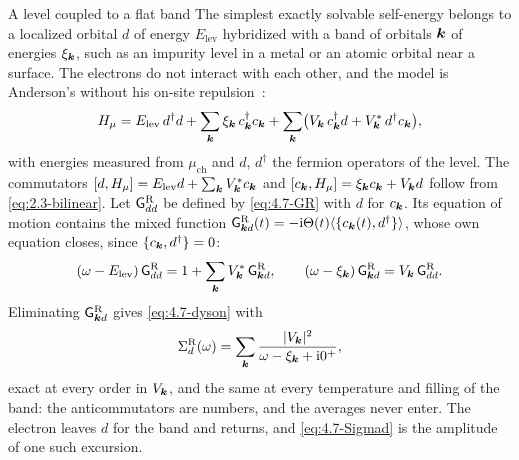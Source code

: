 \begin{workedexample}{A level coupled to a flat band}\label{we:4-level}
The simplest exactly solvable self-energy belongs to a localized orbital $d$ of energy $E_{\mathrm{lev}}$ hybridized with a band of orbitals $\bm{k}$ of energies $\xi_{\bm{k}}$, such as an impurity level in a metal or an atomic orbital near a surface. The electrons do not interact with each other, and the model is Anderson's without his on-site repulsion~\cite{anderson1961localized}:
\begin{equation*}
  H_\mu = E_{\mathrm{lev}}\,d^\dagger d + \sum_{\bm{k}}\xi_{\bm{k}}\,c^\dagger_{\bm{k}}c_{\bm{k}} + \sum_{\bm{k}}\bigl(V_{\bm{k}}\,c^\dagger_{\bm{k}}d + V^*_{\bm{k}}\,d^\dagger c_{\bm{k}}\bigr) ,
\end{equation*}
with energies measured from $\mu_{\mathrm{ch}}$ and $d$, $d^\dagger$ the fermion operators of the level. The commutators $[d, H_\mu] = E_{\mathrm{lev}}d + \sum_{\bm{k}}V^*_{\bm{k}}c_{\bm{k}}$ and $[c_{\bm{k}}, H_\mu] = \xi_{\bm{k}}c_{\bm{k}} + V_{\bm{k}}d$ follow from \cref{eq:2.3-bilinear}. Let $\mathsf{G}^{\mathrm{R}}_{dd}$ be defined by \cref{eq:4.7-GR} with $d$ for $c_{\bm{k}}$. Its equation of motion contains the mixed function $\mathsf{G}^{\mathrm{R}}_{\bm{k}d}(t) = -\mathrm{i}\Theta(t)\langle\{c_{\bm{k}}(t), d^\dagger\}\rangle$, whose own equation closes, since $\{c_{\bm{k}}, d^\dagger\} = 0$:
\begin{equation*}
  (\omega - E_{\mathrm{lev}})\,\mathsf{G}^{\mathrm{R}}_{dd} = 1 + \sum_{\bm{k}}V^*_{\bm{k}}\,\mathsf{G}^{\mathrm{R}}_{\bm{k}d}, \qquad
  (\omega - \xi_{\bm{k}})\,\mathsf{G}^{\mathrm{R}}_{\bm{k}d} = V_{\bm{k}}\,\mathsf{G}^{\mathrm{R}}_{dd} .
\end{equation*}
Eliminating $\mathsf{G}^{\mathrm{R}}_{\bm{k}d}$ gives \cref{eq:4.7-dyson} with
\begin{equation}
  \Sigma^{\mathrm{R}}_d(\omega) = \sum_{\bm{k}}\frac{|V_{\bm{k}}|^2}{\omega - \xi_{\bm{k}} + \mathrm{i}0^+} ,
  \label{eq:4.7-Sigmad}
\end{equation}
exact at every order in $V_{\bm{k}}$, and the same at every temperature and filling of the band: the anticommutators are numbers, and the averages never enter. The electron leaves $d$ for the band and returns, and \cref{eq:4.7-Sigmad} is the amplitude of one such excursion.


\end{workedexample}
